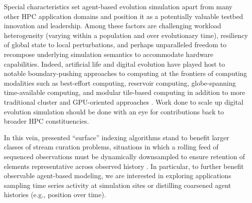 Special characteristics set agent-based evolution simulation apart from many other HPC application domains and position it as a potentially valuable testbed innovation and leadership.
Among these factors are challenging workload heterogeneity (varying within a population and over evolutionary time), resiliency of global state to local perturbations, and perhaps unparalleled freedom to recompose underlying simulation semantics to accommodate hardware capabilities.
Indeed, artificial life and digital evolution have played host to notable boundary-pushing approaches to computing at the frontiers of computing modalities such as best-effort computing, reservoir computing, globe-spanning time-available computing, and modular tile-based computing in addition to more traditional cluster and GPU-oriented approaches \citep{moreno2021conduit,ackley2020best,ackley2023robust,heinemann2008artificial,miikkulainen2024evolving}.
Work done to scale up digital evolution simulation should be done with an eye for contributions back to broader HPC constituencies.



In this vein, presented ``surface'' indexing algorithms stand to benefit larger classes of stream curation problems, situations in which a rolling feed of sequenced observations must be dynamically downsampled to ensure retention of elements representative across observed history \citep{streamcurationpreprint}.
In particular, to further benefit observable agent-based modeling, we are interested in exploring applications sampling time series activity at simulation sites or distilling coarsened agent histories (e.g., position over time).

